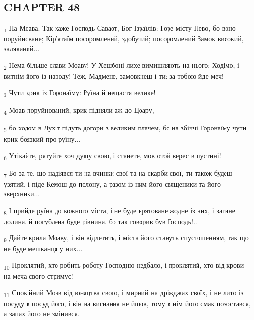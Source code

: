 \subsection{CHAPTER 48}
\begin{tcolorbox}
\textsubscript{1} На Моава. Так каже Господь Саваот, Бог Ізраїлів: Горе місту Нево, бо воно поруйноване; Кір'ятаїм посоромлений, здобутий; посоромлений Замок високий, заляканий...
\end{tcolorbox}
\begin{tcolorbox}
\textsubscript{2} Нема більше слави Моаву! У Хешбоні лихе вимишляють на нього: Ходімо, і витнім його із народу! Теж, Мадмене, замовкнеш і ти: за тобою йде меч!
\end{tcolorbox}
\begin{tcolorbox}
\textsubscript{3} Чути крик із Горонаїму: Руїна й нещастя велике!
\end{tcolorbox}
\begin{tcolorbox}
\textsubscript{4} Моав поруйнований, крик підняли аж до Цоару,
\end{tcolorbox}
\begin{tcolorbox}
\textsubscript{5} бо ходом в Лухіт підуть догори з великим плачем, бо на збіччі Горонаїму чути крик боязкий про руїну...
\end{tcolorbox}
\begin{tcolorbox}
\textsubscript{6} Утікайте, рятуйте хоч душу свою, і станете, мов отой верес в пустині!
\end{tcolorbox}
\begin{tcolorbox}
\textsubscript{7} Бо за те, що надіявся ти на вчинки свої та на скарби свої, ти також будеш узятий, і піде Кемош до полону, а разом із ним його священики та його зверхники...
\end{tcolorbox}
\begin{tcolorbox}
\textsubscript{8} І прийде руїна до кожного міста, і не буде врятоване жодне із них, і загине долина, й погублена буде рівнина, бо так говорив був Господь!...
\end{tcolorbox}
\begin{tcolorbox}
\textsubscript{9} Дайте крила Моаву, і він відлетить, і міста його стануть спустошенням, так що не буде мешканця у них...
\end{tcolorbox}
\begin{tcolorbox}
\textsubscript{10} Проклятий, хто робить роботу Господню недбало, і проклятий, хто від крови на меча свого стримує!
\end{tcolorbox}
\begin{tcolorbox}
\textsubscript{11} Спокійний Моав від юнацтва свого, і мирний на дріжджах своїх, і не лито із посуду в посуд його, і він на вигнання не йшов, тому в нім його смак позостався, а запах його не змінився.
\end{tcolorbox}
